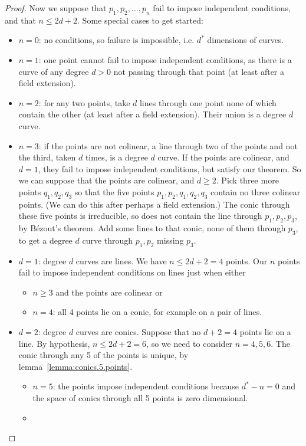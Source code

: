 \begin{proof}
Now we suppose that \(p_1,p_2,\dots,p_n\) fail to impose independent conditions, and that \(n \le 2d+2\).
Some special cases to get started:
\begin{itemize}
\item \(n=0\): no conditions, so failure is impossible, i.e. \(d^*\) dimensions of curves.
\item \(n=1\): one point cannot fail to impose independent conditions, as there is a curve of any degree \(d > 0\) not passing through that point (at least after a field extension).
\item \(n=2\): for any two points, take \(d\) lines through one point none of which contain the other (at least after a field extension). Their union is a degree \(d\) curve.
\item \(n=3\): if the points are not colinear, a line through two of the points and not the third, taken \(d\) times, is a degree \(d\) curve.
If the points are colinear, and \(d=1\), they fail to impose independent conditions, but satisfy our theorem.
So we can suppose that the points are colinear, and \(d \ge 2\).
Pick three more points \(q_1,q_2,q_3\) so that the five points \(p_1,p_2,q_1,q_2,q_3\) contain no three colinear points.
(We can do this after perhaps a field extension.)
The conic through these five points is irreducible, so does not contain the line through \(p_1,p_2,p_3\), by B\'ezout's theorem.
Add some lines to that conic, none of them through \(p_3\), to get a degree \(d\) curve through \(p_1,p_2\) missing \(p_3\).
\item \(d=1\): degree \(d\) curves are lines. 
We have \(n\le 2d+2=4\) points.
Our \(n\) points fail to impose independent conditions on lines just when either 
\begin{itemize}
\item
\(n\ge 3\) and the points are colinear or
\item
\(n=4\): all 4 points lie on a conic, for example on a pair of lines.
\end{itemize}
\item \(d=2\): degree \(d\) curves are conics.
Suppose that no \(d+2=4\) points lie on a line.
By hypothesis, \(n \le 2d+2=6\), so we need to consider \(n=4,5,6\).
The conic through any 5 of the points is unique, by lemma~\vref{lemma:conics.5.points}.
\begin{itemize}
\item
\(n=5\): the points impose independent conditions because \(d^*-n=0\) and the space of conics through all 5 points is zero dimensional.
\item

\end{itemize}
\end{itemize}
\end{proof}
